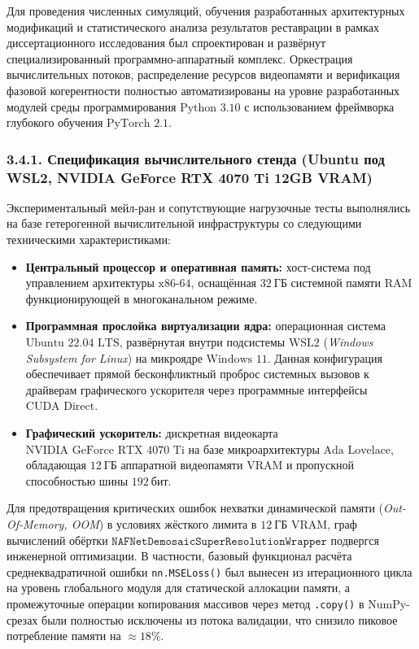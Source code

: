\documentclass[12pt,a4paper]{article}
\begin{document}
Для проведения численных симуляций, обучения разработанных архитектурных модификаций и статистического анализа результатов реставрации в рамках диссертационного исследования был спроектирован и развёрнут специализированный программно-аппаратный комплекс. Оркестрация вычислительных потоков, распределение ресурсов видеопамяти и верификация фазовой когерентности полностью автоматизированы на уровне разработанных модулей среды программирования $\text{Python 3.10}$ с использованием фреймворка глубокого обучения $\text{PyTorch 2.1}$.

\subsubsection{3.4.1. Спецификация вычислительного стенда (Ubuntu под WSL2, NVIDIA GeForce RTX 4070 Ti 12GB VRAM)}

Экспериментальный мейл-ран и сопутствующие нагрузочные тесты выполнялись на базе гетерогенной вычислительной инфраструктуры со следующими техническими характеристиками:
\begin{itemize}
    \item \textbf{Центральный процессор и оперативная память:} хост-система под управлением архитектуры $\text{x86-64}$, оснащённая $32~\text{ГБ}$ системной памяти $\text{RAM}$ функционирующей в многоканальном режиме.
    \item \textbf{Программная прослойка виртуализации ядра:} операционная система $\text{Ubuntu 22.04 LTS}$, развёрнутая внутри подсистемы $\text{WSL2}$ (\textit{Windows Subsystem for Linux}) на микроядре $\text{Windows 11}$. Данная конфигурация обеспечивает прямой бесконфликтный проброс системных вызовов к драйверам графического ускорителя через программные интерфейсы $\text{CUDA Direct}$.
    \item \textbf{Графический ускоритель:} дискретная видеокарта $\text{NVIDIA GeForce RTX 4070 Ti}$ на базе микроархитектуры $\text{Ada Lovelace}$, обладающая $12~\text{ГБ}$ аппаратной видеопамяти $\text{VRAM}$ и пропускной способностью шины $192~\text{бит}$. 
\end{itemize}

Для предотвращения критических ошибок нехватки динамической памяти (\textit{Out-Of-Memory, OOM}) в условиях жёсткого лимита в $12~\text{ГБ}$ $\text{VRAM}$, граф вычислений обёртки $\texttt{NAFNetDemosaicSuperResolutionWrapper}$ подвергся инженерной оптимизации. В частности, базовый функционал расчёта среднеквадратичной ошибки \texttt{nn.MSELoss()} был вынесен из итерационного цикла на уровень глобального модуля для статической аллокации памяти, а промежуточные операции копирования массивов через метод \texttt{.copy()} в NumPy-срезах были полностью исключены из потока валидации, что снизило пиковое потребление памяти на $\approx 18\%$.
\end{document}
